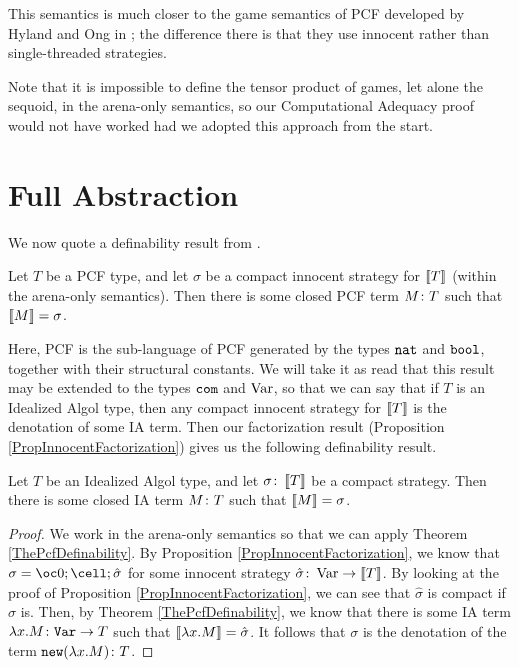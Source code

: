 \documentclass[11pt]{report}
\begin{document}
This semantics is much closer to the game semantics of PCF developed by Hyland and Ong in \cite{hoPcf}; the difference there is that they use innocent rather than single-threaded strategies.

Note that it is impossible to define the tensor product of games, let alone the sequoid, in the arena-only semantics, so our Computational Adequacy proof would not have worked had we adopted this approach from the start.

\section{Full Abstraction}

We now quote a definability result from \cite{hoPcf}.

\begin{theorem}
  Let $T$ be a PCF type, and let $\sigma$ be a compact innocent strategy for $\left\llbracket T\right\rrbracket$ (within the arena-only semantics).  
  Then there is some closed PCF term $M\colon T$ such that $\left\llbracket M\right\rrbracket=\sigma$.
  \label{ThePcfDefinability}
\end{theorem}

Here, PCF is the sub-language of PCF generated by the types ${\mathtt{nat}}$ and ${\mathtt{bool}}$, together with their structural constants.  
We will take it as read that this result may be extended to the types ${\mathtt{com}}$ and $\operatorname{Var}$, so that we can say that if $T$ is an Idealized Algol type, then any compact innocent strategy for $\left\llbracket T\right\rrbracket$ is the denotation of some IA term.
Then our factorization result (Proposition \ref{PropInnocentFactorization}) gives us the following definability result.

\begin{proposition}
  Let $T$ be an Idealized Algol type, and let $\sigma\colon \left\llbracket T\right\rrbracket$ be a compact strategy.
  Then there is some closed IA term $M\colon T$ such that $\left\llbracket M\right\rrbracket=\sigma$.
  \label{PropIaDefinability}
\end{proposition}
\begin{proof}
  We work in the arena-only semantics so that we can apply Theorem \ref{ThePcfDefinability}.  
  By Proposition \ref{PropInnocentFactorization}, we know that $\sigma=\oc 0;\cell;\hat{\sigma}$ for some innocent strategy $\hat\sigma \colon \operatorname{Var} \to \left\llbracket T\right\rrbracket$.
  By looking at the proof of Proposition \ref{PropInnocentFactorization}, we can see that $\hat\sigma$ is compact if $\sigma$ is.
  Then, by Theorem \ref{ThePcfDefinability}, we know that there is some IA term $\lambda x.M\colon {\mathtt{Var}} \to T$ such that $\left\llbracket\lambda x.M\right\rrbracket=\hat\sigma$.  
  It follows that $\sigma$ is the denotation of the term ${\mathtt{new}}(\lambda x.M)\colon T$.
\end{proof}
\end{document}
